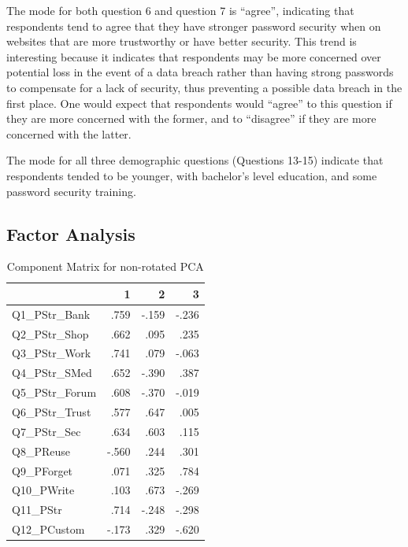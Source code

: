 \documentclass[letterpaper, 10 pt, conference]{ieeeconf}  %
\begin{document}
The mode for both question 6 and question 7 is “agree”, indicating that respondents tend to agree that they have stronger password security when on websites that are more trustworthy or have better security. This trend is interesting because it indicates that respondents may be more concerned over potential loss in the event of a data breach rather than having strong passwords to compensate for a lack of security, thus preventing a possible data breach in the first place. One would expect that respondents would “agree” to this question if they are more concerned with the former, and to “disagree” if they are more concerned with the latter.

The mode for all three demographic questions (Questions 13-15) indicate that respondents tended to be younger, with bachelor’s level education, and some password security training.

\subsection{Factor Analysis}

\begin{table}[h]
\caption{Component Matrix for non-rotated PCA}
\label{tab:compmatrix}
\begin{center}
\begin{tabular}{lrrr}
\hline
                & 1     & 2     & 3     \\ \hline
Q1\_PStr\_Bank  & .759  & -.159 & -.236 \\ \hline
Q2\_PStr\_Shop  & .662  & .095  & .235  \\ \hline
Q3\_PStr\_Work  & .741  & .079  & -.063 \\ \hline
Q4\_PStr\_SMed  & .652  & -.390 & .387  \\ \hline
Q5\_PStr\_Forum & .608  & -.370 & -.019 \\ \hline
Q6\_PStr\_Trust & .577  & .647  & .005  \\ \hline
Q7\_PStr\_Sec   & .634  & .603  & .115  \\ \hline
Q8\_PReuse      & -.560 & .244  & .301  \\ \hline
Q9\_PForget     & .071  & .325  & .784  \\ \hline
Q10\_PWrite     & .103  & .673  & -.269 \\ \hline
Q11\_PStr       & .714  & -.248 & -.298 \\ \hline
Q12\_PCustom    & -.173 & .329  & -.620 \\ \hline
\end{tabular}
\end{center}
\end{table}
\end{document}
